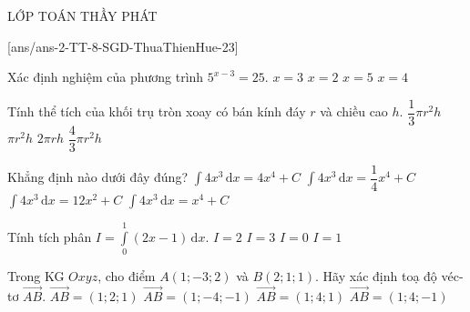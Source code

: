 \begin{name}
	{\tenchude}{\tendethi}{LỚP TOÁN THẦY PHÁT}{\thoigian}
\end{name}
\setcounter{ex}{0}\setcounter{bt}{0}
[ans/ans-2-TT-8-SGD-ThuaThienHue-23]
\begin{ex}%
	Xác định nghiệm của phương trình $5^{x-3}=25$.
	\choice
	{$x=3$}
	{$x=2$}
	{\True $x=5$}
	{$x=4$}
\end{ex}
\begin{ex}%
	Tính thể tích của khối trụ tròn xoay có bán kính đáy $r$ và chiều cao $h$.
	\choice
	{$\dfrac{1}{3}\pi r^2 h$}
	{\True $\pi r^2 h$}
	{$2\pi r h$}
	{$\dfrac{4}{3} \pi r^2 h$}
\end{ex}
\begin{ex}%
	Khẳng định nào dưới đây đúng?
	\choice
	{$\displaystyle\int 4x^3 \mathrm{\,d}x=4x^4+C$}
	{$\displaystyle\int 4x^3 \mathrm{\,d}x=\dfrac{1}{4}x^4+C$}
	{$\displaystyle\int 4x^3 \mathrm{\,d}x=12x^2+C$}
	{\True $\displaystyle\int 4x^3 \mathrm{\,d}x=x^4+C$}
\end{ex}
\begin{ex}%
	Tính tích phân $I=\displaystyle\int\limits_0^1(2x-1) \mathrm{\,d}x$.
	\choice
	{$I=2$}
	{$I=3$}
	{\True $I=0$}
	{$I=1$}
\end{ex}
\begin{ex}%
	Trong KG $Oxyz$, cho điểm $A(1;-3;2)$ và $B(2;1;1)$. Hãy xác định toạ độ véc-tơ $\overrightarrow{AB}$.
	\choice
	{$\overrightarrow{AB}=(1;2;1)$}
	{$\overrightarrow{AB}=(1;-4;-1)$}
	{$\overrightarrow{AB}=(1;4;1)$}
	{\True $\overrightarrow{AB}=(1;4;-1)$}
\end{ex}
